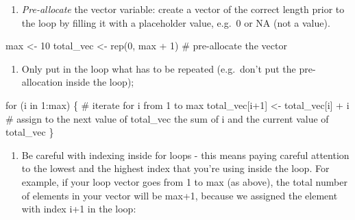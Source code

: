 \documentclass[
  letterpaper,
  DIV=11,
  numbers=noendperiod]{scrreprt}
\newenvironment{Shaded}{\begin{snugshade}}{\end{snugshade}}
\newcommand{\CommentTok}[1]{\textcolor[rgb]{0.37,0.37,0.37}{#1}}
\newcommand{\ControlFlowTok}[1]{\textcolor[rgb]{0.00,0.23,0.31}{#1}}
\newcommand{\DecValTok}[1]{\textcolor[rgb]{0.68,0.00,0.00}{#1}}
\newcommand{\FunctionTok}[1]{\textcolor[rgb]{0.28,0.35,0.67}{#1}}
\newcommand{\NormalTok}[1]{\textcolor[rgb]{0.00,0.23,0.31}{#1}}
\newcommand{\OtherTok}[1]{\textcolor[rgb]{0.00,0.23,0.31}{#1}}
\newcommand{\SpecialCharTok}[1]{\textcolor[rgb]{0.37,0.37,0.37}{#1}}
\providecommand{\tightlist}{%
  \setlength{\itemsep}{0pt}\setlength{\parskip}{0pt}}\usepackage{longtable,booktabs,array}
\begin{document}
\begin{enumerate}
\def\labelenumi{\arabic{enumi}.}
\tightlist
\item
  \emph{Pre-allocate} the vector variable: create a vector of the
  correct length prior to the loop by filling it with a placeholder
  value, e.g.~0 or NA (not a value).
\end{enumerate}

\begin{Shaded}
\begin{Highlighting}[]
\NormalTok{max }\OtherTok{\textless{}{-}} \DecValTok{10}
\NormalTok{total\_vec }\OtherTok{\textless{}{-}} \FunctionTok{rep}\NormalTok{(}\DecValTok{0}\NormalTok{, max }\SpecialCharTok{+} \DecValTok{1}\NormalTok{)  }\CommentTok{\# pre{-}allocate the vector}
\end{Highlighting}
\end{Shaded}

\begin{enumerate}
\def\labelenumi{\arabic{enumi}.}
\setcounter{enumi}{1}
\tightlist
\item
  Only put in the loop what has to be repeated (e.g.~don't put the
  pre-allocation inside the loop);
\end{enumerate}

\begin{Shaded}
\begin{Highlighting}[]
\ControlFlowTok{for}\NormalTok{ (i }\ControlFlowTok{in} \DecValTok{1}\SpecialCharTok{:}\NormalTok{max) \{ }\CommentTok{\# iterate for i from 1 to max}
\NormalTok{  total\_vec[i}\SpecialCharTok{+}\DecValTok{1}\NormalTok{] }\OtherTok{\textless{}{-}}\NormalTok{ total\_vec[i] }\SpecialCharTok{+}\NormalTok{ i }\CommentTok{\# assign to the next value of total\_vec the sum of i and the current value of total\_vec}
\NormalTok{\}}
\end{Highlighting}
\end{Shaded}

\begin{enumerate}
\def\labelenumi{\arabic{enumi}.}
\setcounter{enumi}{2}
\tightlist
\item
  Be careful with indexing inside for loops - this means paying careful
  attention to the lowest and the highest index that you're using inside
  the loop. For example, if your loop vector goes from 1 to max (as
  above), the total number of elements in your vector will be max+1,
  because we assigned the element with index i+1 in the loop:
\end{enumerate}
\end{document}
